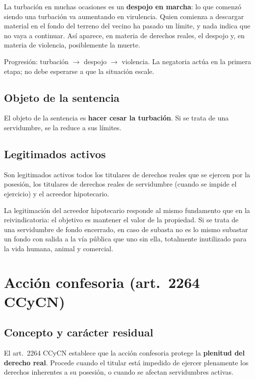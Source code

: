 \documentclass[12pt,oneside]{book}
\begin{document}
La turbación en muchas ocasiones es un \textbf{despojo en marcha}: lo que comenzó siendo una turbación va aumentando en virulencia. Quien comienza a descargar material en el fondo del terreno del vecino ha pasado un límite, y nada indica que no vaya a continuar. Así aparece, en materia de derechos reales, el despojo y, en materia de violencia, posiblemente la muerte.

\begin{important}
Progresión: turbación $\rightarrow$ despojo $\rightarrow$ violencia. La negatoria actúa en la primera etapa; no debe esperarse a que la situación escale.
\end{important}

\subsection{Objeto de la sentencia}

El objeto de la sentencia es \textbf{hacer cesar la turbación}. Si se trata de una servidumbre, se la reduce a sus límites.

\subsection{Legitimados activos}

Son legitimados activos todos los titulares de derechos reales que se ejercen por la posesión, los titulares de derechos reales de servidumbre (cuando se impide el ejercicio) y el acreedor hipotecario.

La legitimación del acreedor hipotecario responde al mismo fundamento que en la reivindicatoria: el objetivo es mantener el valor de la propiedad. Si se trata de una servidumbre de fondo encerrado, en caso de subasta no es lo mismo subastar un fondo con salida a la vía pública que uno sin ella, totalmente inutilizado para la vida humana, animal y comercial.

\section{Acción confesoria (art.\ 2264 CCyCN)}

\subsection{Concepto y carácter residual}

El art.\ 2264 CCyCN establece que la acción confesoria protege la \textbf{plenitud del derecho real}. Procede cuando el titular está impedido de ejercer plenamente los derechos inherentes a su posesión, o cuando se afectan servidumbres activas.
\end{document}

